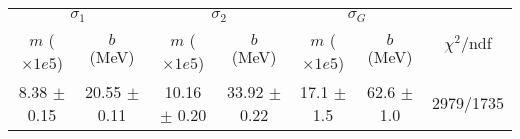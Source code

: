 \begin{tabular}{cc|cc|cc||c}
\multicolumn{2}{c|}{$\sigma_1$} & \multicolumn{2}{|c}{$\sigma_2$} & \multicolumn{2}{|c}{$\sigma_G$}  & \multirow{2}{*}{$\chi^2/$ndf}\\
$m$ ($\times1e5$) & $b$ (MeV) & $m$ ($\times1e5$) & $b$ (MeV) & $m$ ($\times1e5$) & $b$ (MeV) & \\
\hline
8.38 $\pm$ 0.15 & 20.55 $\pm$ 0.11 & 10.16 $\pm$ 0.20 & 33.92 $\pm$ 0.22 & 17.1 $\pm$ 1.5 & 62.6 $\pm$ 1.0 & 2979/1735\\
\end{tabular}

